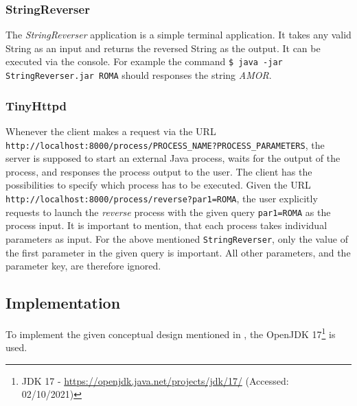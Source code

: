 \subsubsection{StringReverser}\label{subsubsec:01_part1_design_stringreverser}
The \textit{StringReverser} application is a simple terminal application. It takes any valid String as an input and returns the reversed String as the output. It can be executed via the console. For example the command \texttt{\$ java -jar StringReverser.jar ROMA} should responses the string \textit{AMOR}.

\subsubsection{TinyHttpd}\label{subsubsec:01_part1_design_tinyhttpd}
Whenever the client makes a request via the URL \texttt{http://localhost:8000/process/PROCESS\_NAME?PROCESS\_PARAMETERS}, the server is supposed to start an external Java process, waits for the output of the process, and responses the process output to the user.
The client has the possibilities to specify which process has to be executed. Given the URL \texttt{http://localhost:8000/process/reverse?par1=ROMA}, the user explicitly requests to launch the \textit{reverse} process with the given query \texttt{par1=ROMA} as the process input.
It is important to mention, that each process takes individual parameters as input. For the above mentioned \texttt{StringReverser}, only the value of the first parameter in the given query is important. All other parameters, and the parameter key, are therefore ignored.

\subsection{Implementation}\label{subsec:01_part1_impl}
To implement the given conceptual design mentioned in , the OpenJDK 17\footnote{JDK 17 - \url{https://openjdk.java.net/projects/jdk/17/} (Accessed: 02/10/2021)} is used.


